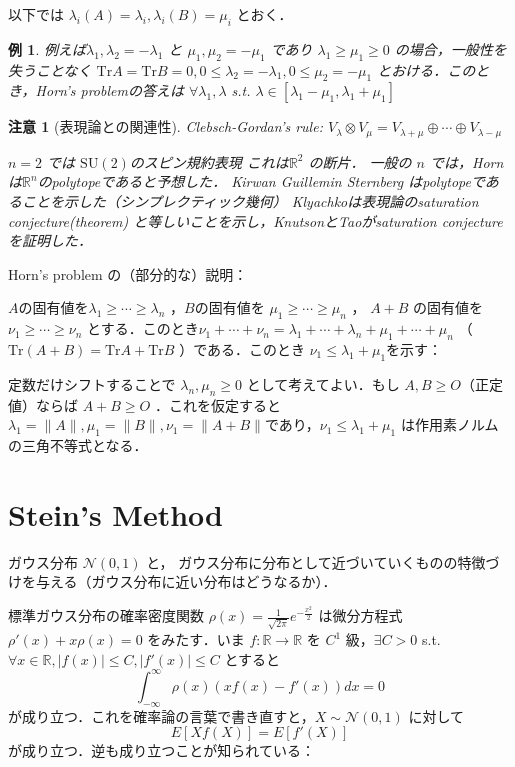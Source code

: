 \documentclass{ltjsarticle}
\theoremstyle{mystyle1}
\theoremstyle{mystyle2}
\newtheorem{example}{例}
\newtheorem{note*}{注意}
\theoremstyle{mystyle3}
\begin{document}
以下では $\lambda_i(A)=\lambda_i,\lambda_i(B)=\mu_i$ とおく．

\begin{example}
    例えば$\lambda_1,\lambda_2=-\lambda_1$ と $\mu_1,\mu_2=-\mu_1$ であり $\lambda_1\geq\mu_1\geq 0$ の場合，一般性を失うことなく $\mathrm{Tr}A=\mathrm{Tr}B=0,0\leq\lambda_2=-\lambda_1,0\leq\mu_2=-\mu_1$ とおける．このとき，Horn's problemの答えは $\forall\lambda_1,\lambda$ s.t. $\lambda\in[\lambda_1-\mu_1,\lambda_1+\mu_1]$
\end{example}

\begin{note*}[表現論との関連性]
    Clebsch-Gordan's rule: $V_\lambda\otimes V_\mu=V_{\lambda+\mu}\oplus\cdots\oplus V_{\lambda-\mu}$

    $n=2$ では $\mathrm{SU}(2)$のスピン規約表現 これは$\mathbb{R}^2$ の断片．
    一般の $n$ では，Hornは$\mathbb{R}^n$のpolytopeであると予想した．
    Kirwan Guillemin Sternberg はpolytopeであることを示した（シンプレクティック幾何）
    Klyachkoは表現論のsaturation conjecture(theorem) と等しいことを示し，KnutsonとTaoがsaturation conjectureを証明した．
\end{note*}

Horn's problem の（部分的な）説明：

$A$の固有値を$\lambda_1\geq\cdots\geq\lambda_n$ ，$B$の固有値を $\mu_1\geq\cdots\geq\mu_n$ ， $A+B$ の固有値を $\nu_1\geq\cdots\geq\nu_n$ とする．このとき$\nu_1+\cdots+\nu_n=\lambda_1+\cdots+\lambda_n+\mu_1+\cdots+\mu_n$ （ $\mathrm{Tr}(A+B)=\mathrm{Tr}A+\mathrm{Tr}B$ ）である．このとき $\nu_1\leq \lambda_1+\mu_1$を示す：

定数だけシフトすることで $\lambda_n,\mu_n\geq 0$ として考えてよい．もし $A,B\geq O$（正定値）ならば $A+B\geq O$ ．これを仮定すると$\lambda_1=\|A\|,\mu_1=\|B\|,\nu_1=\|A+B\|$であり，$\nu_1\leq \lambda_1+\mu_1$ は作用素ノルムの三角不等式となる．


\section{Stein's Method}


ガウス分布 $\mathcal{N}(0,1)$ と， ガウス分布に分布として近づいていくものの特徴づけを与える（ガウス分布に近い分布はどうなるか）．

標準ガウス分布の確率密度関数 $\rho(x)=\frac{1}{\sqrt{2\pi}}e^{-\frac{x^2}{2}}$ は微分方程式 $\rho'(x)+x\rho(x)=0$ をみたす．いま $f:\mathbb{R}\to\mathbb{R}$ を $C^1$ 級，$\exists C>0$ s.t. $\forall x\in\mathbb{R},|f(x)|\leq C,|f'(x)|\leq C$ とすると
\begin{equation}
    \int_{-\infty}^{\infty}\rho(x)(xf(x)-f'(x))dx=0
\end{equation}
が成り立つ．これを確率論の言葉で書き直すと，$X\sim\mathcal{N}(0,1)$ に対して
\begin{equation}
    E[Xf(X)]=E[f'(X)]
\end{equation}
が成り立つ．逆も成り立つことが知られている：
\end{document}
